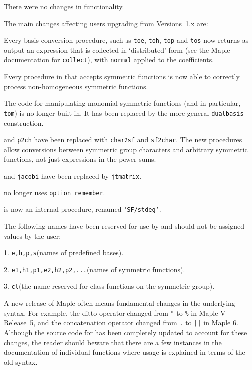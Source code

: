 There were no changes in functionality.

 The main changes affecting users upgrading
from Versions~1.x are:

\bitem Every basis-conversion procedure, such as {\tt toe}, {\tt toh},
{\tt top} and {\tt tos} now returns as output an expression that is
collected in `distributed' form (see the Maple documentation for
{\tt collect}), with {\tt normal} applied to the coefficients.

\bitem Every procedure in \SF{} that accepts symmetric functions is now
able to correctly process non-homogeneous symmetric functions.

\bitem The code for manipulating monomial symmetric functions (and
in particular, {\tt tom}) is no longer built-in. It has been replaced by
the more general {\tt dual\ul{}basis} construction.

 and {\tt p2ch} have been replaced with {\tt char2sf} and
{\tt sf2char}. The new procedures allow conversions between symmetric
group characters and arbitrary symmetric functions, not just expressions
in the power-sums.

 and {\tt jacobi} have been replaced by
{\tt jt\ul{}matrix}.

 no longer uses {\tt option remember}.

 is now an internal procedure, renamed {\tt `SF/stdeg`}.
 
The following names have been reserved for use by \SF{} and should not be
assigned values by the user:

\smallskip
\item{1.} {\tt e,h,p,s}\quad (names of predefined bases).
\item{2.} {\tt e1,h1,p1,e2,h2,p2,...}\quad (names of symmetric functions).
\item{3.} {\tt cl}\quad (the name reserved for class functions on the
  symmetric group).

A new release of Maple often means fundamental changes in the underlying
syntax. For example, the ditto operator changed from {\tt "} to {\tt \%}
in Maple V Release~5, and the concatenation operator changed from {\tt .}
to {\tt ||} in Maple 6. Although the source code for \SF{} has been
completely updated to account for these changes, the reader should beware
that there are a few instances in the documentation of individual functions
where usage is explained in terms of the old syntax.

